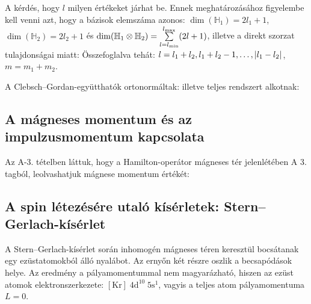    A kérdés, hogy $l$ milyen értékeket járhat be. Ennek meghatározásához figyelembe kell venni azt, hogy a bázisok elemszáma azonos: $\dim(\mathbb{H}_1)=2l_1+1$, $\dim(\mathbb{H}_2)=2l_2+1$ és $\dim(\mathbb{H}_1\otimes\mathbb{H}_2)=\sum\limits_{l=l_\text{min}}^{l_\text{max}}(2l+1)$, illetve a direkt szorzat tulajdonságai miatt:
   Összefoglalva tehát: $l=l_1+l_2,l_1+l_2-1,\dots,\left\lvert l_1-l_2\right\rvert$, $m=m_1+m_2$. 
   
   A Clebsch--Gordan-együtthatók ortonormáltak:
   illetve teljes rendszert alkotnak:
   
  \subsection{A mágneses momentum és az impulzusmomentum kapcsolata}
   
   Az A-3. tételben láttuk, hogy a Hamilton-operátor mágneses tér jelenlétében
   A 3. tagból, leolvashatjuk mágnese momentum értékét:
   
  \subsection{A spin létezésére utaló kísérletek: Stern--Gerlach-kísérlet}
   
   A Stern--Gerlach-kísérlet során inhomogén mágneses téren keresztül bocsátanak egy ezüstatomokból álló nyalábot. Az ernyőn két részre oszlik a becsapódások helye. Az eredmény a pályamomentummal nem magyarázható, hiszen az ezüst atomok elektronszerkezete: $[\text{Kr}]\;4\text{d}^{10}\;5\text{s}^1$, vagyis a teljes atom pályamomentuma $L=0$. 
   
